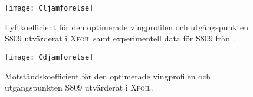 \begin{figure}[!htb]
  \centering
  \texttt{[image: Cljamforelse]}
  \caption{Lyftkoefficient för den optimerade vingprofilen och utgångspunkten S809 utvärderat i \textsc{Xfoil} samt experimentell data för S809 från \citet{s809re20}.}
  \label{Cljamforelse}
\end{figure}

\begin{figure}[!htb]
  \centering
  \texttt{[image: Cdjamforelse]}
  \caption{Motståndskoefficient för den optimerade vingprofilen och utgångspunkten S809 utvärderat i \textsc{Xfoil}.}
  \label{Cdjamforelse}
\end{figure}

